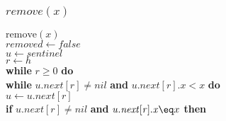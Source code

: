 \documentclass{beamer}
\begin{document}
\begin{frame}[shrink]
\frametitle{$remove(x)$}
\begin{oframed}
\begin{flushleft}
\hspace*{1em} \ensuremath{\mathrm{remove}(\ensuremath{\mathit{x}})}\\
\hspace*{1em} \hspace*{1em} \ensuremath{\ensuremath{\mathit{removed}} \gets  \ensuremath{\ensuremath{\mathit{false}}}}\\
\hspace*{1em} \hspace*{1em} \ensuremath{\ensuremath{\mathit{u}} \gets  \ensuremath{sentinel}}\\
\hspace*{1em} \hspace*{1em} \ensuremath{\ensuremath{\mathit{r}} \gets  \ensuremath{h}}\\
\hspace*{1em} \hspace*{1em} {\color{black} \textbf{while}} \ensuremath{\ensuremath{\mathit{r}} \ge 0} {\color{black} \textbf{do}} \\
\hspace*{1em} \hspace*{1em} \hspace*{1em} {\color{black} \textbf{while}} \ensuremath{\ensuremath{\mathit{u}}.\ensuremath{\mathit{next}}[\ensuremath{\mathit{r}}] \ne nil} {\color{black} \textbf{and}} \ensuremath{\ensuremath{\mathit{u}}.\ensuremath{\mathit{next}}[\ensuremath{\mathit{r}}].\ensuremath{\mathit{x}} < x} {\color{black} \textbf{do}} \\
\hspace*{1em} \hspace*{1em} \hspace*{1em} \hspace*{1em} \ensuremath{\ensuremath{\mathit{u}} \gets  \ensuremath{\ensuremath{\mathit{u}}.\ensuremath{\mathit{next}}[\ensuremath{\mathit{r}}]}}\\
\hspace*{1em} \hspace*{1em} \hspace*{1em} {\color{black} \textbf{if}} \ensuremath{\ensuremath{\mathit{u}}.\ensuremath{\mathit{next}}[\ensuremath{\mathit{r}}] \ne nil} {\color{black} \textbf{and}} \ensuremath{\ensuremath{\mathit{u}}.\ensuremath{\mathit{next}}[\ensuremath{\mathit{r}}].\ensuremath{\mathit{x}} \eq x} {\color{black} \textbf{then}} \\

\end{flushleft}
\end{oframed}
\end{frame}
\end{document}

